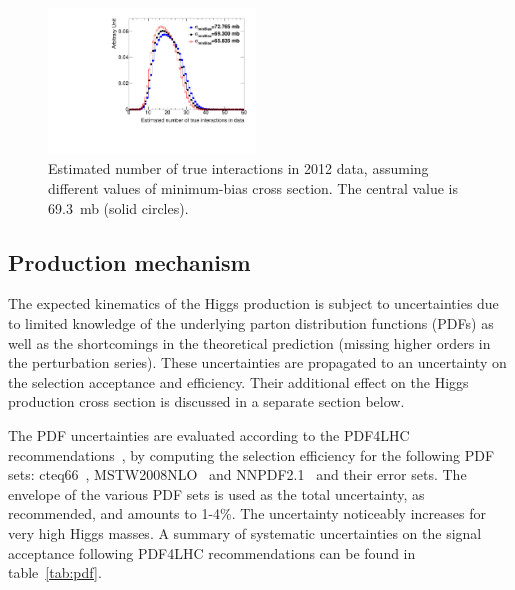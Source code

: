 \begin{figure}[bh]
\centering
\includegraphics[width=0.49\textwidth]{plots/data_pileup.pdf}
\caption{Estimated number of true interactions in 2012 data, assuming different values of minimum-bias cross section. The central value is 69.3~mb (solid circles).}
\label{fig:shiftedDataPileup}
\end{figure}


\subsection{Production mechanism}

The expected kinematics of the Higgs production is subject to uncertainties due to limited knowledge of  the underlying parton distribution functions (PDFs) as well as the shortcomings in the theoretical prediction (missing higher orders in the perturbation series). These uncertainties are propagated to an uncertainty on the selection acceptance and efficiency. Their additional effect on the Higgs production cross section is discussed in a separate section below.

The PDF uncertainties are evaluated according to the PDF4LHC recommendations~\cite{pdf4lhc}, by computing the selection efficiency for the following PDF sets: cteq66~\cite{cteq}, MSTW2008NLO~\cite{MSTW} and  NNPDF2.1~\cite{NNPDF} and their error sets. The envelope of the various PDF sets is used as the total uncertainty, as recommended, and amounts to 1-4\%. The uncertainty noticeably increases for very high Higgs masses. A summary of systematic uncertainties on the signal acceptance following PDF4LHC recommendations can be found in table~\ref{tab:pdf}.

